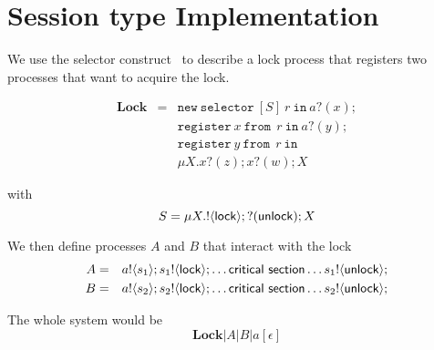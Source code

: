 \newcommand{\In}{\ensuremath{\mathtt{in}\ }}
\newcommand{\Register}{\ensuremath{\mathtt{register}\ }}
\newcommand{\Select}{\ensuremath{\mathtt{select}\ }}
\newcommand{\To}{\ensuremath{\mathtt{to}\ }}
\newcommand{\From}{\ensuremath{\mathtt{from}\ }}
\newcommand{\New}{\ensuremath{\mathtt{new}\ }}
\newcommand{\Selector}{\ensuremath{\mathtt{selector}\ }}

\newcommand{\newsel}[2]{\New \Selector[#1]\ #2\ \In}
\newcommand{\register}[2]{\Register #1\ \From\ #2\ \In}
\newcommand{\select}[2]{\Select #1\ \From\ #2\ \In}

\newcommand{\shqueue}[2]{#1[#2]}

\newcommand{\es}{\ensuremath{\epsilon}}

\newcommand{\Lock}{\ensuremath{\mathbf{Lock}}}

\newcommand{\out}[2]{\ensuremath{#1!\langle #2 \rangle;}}
\newcommand{\inp}[2]{\ensuremath{#1?(#2);}}
\newcommand{\Par}{|}


\section{Session type Implementation}
\label{sec:scribble}

We use the selector construct~\cite{citation_needed}
to describe a lock process that registers two processes that
want to acquire the lock.

\begin{eqnarray*}
	\Lock &=& \newsel{S}{r} \inp{a}{x} \\
	& & \register{x}{r} \inp{a}{y} \\
	& & \register{y}{r} \\
	& & \mu X. \inp{x}{z} \inp{x}{w} X
\end{eqnarray*}

with
\[
  S = \mu X. !\langle \mathsf{lock} \rangle; ?(\mathsf{unlock}); X
\]


We then define processes $A$ and $B$ that interact with the lock 
\begin{eqnarray*}
	A &=& \out{a}{s_1} \out{s_1}{\lock} \dots \mathsf{critical\ section} \dots \out{s_1}{\unlock} \\
	B &=& \out{a}{s_2} \out{s_2}{\lock} \dots \mathsf{critical\ section} \dots \out{s_2}{\unlock} \\
\end{eqnarray*}

The whole system would be
\[
	\Lock \Par A \Par B \Par \shqueue{a}{\es}
\]
